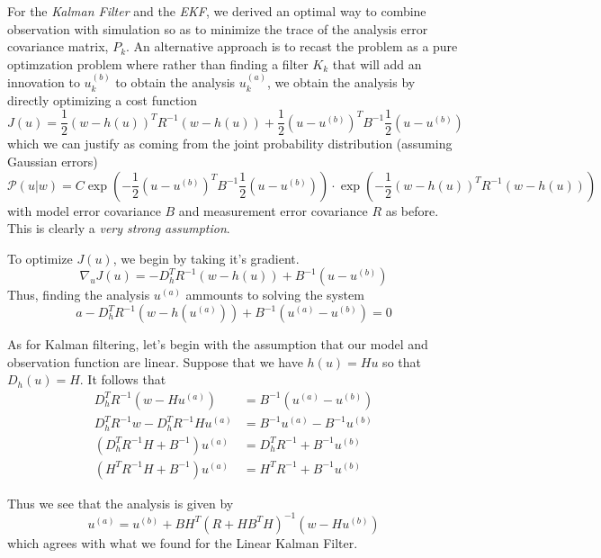 For the \textit{Kalman Filter} and the \textit{EKF}, we derived an optimal way to combine observation with simulation so as to minimize the trace of the analysis error covariance matrix, $P_k$. An alternative approach is to recast the problem as a pure optimzation problem where rather than finding a filter $K_k$ that will add an innovation to $u_k^{(b)}$ to obtain the analysis $u_k^{(a)}$, we obtain the analysis by directly optimizing a cost function
\begin{equation}
J(u) = \frac{1}{2}\left(w - h(u) \right)^TR^{-1}\left(w - h(u) \right) + \frac{1}{2}\left(u - u^{(b)} \right)^TB^{-1}\frac{1}{2}\left(u - u^{(b)} \right)
\end{equation}
which we can justify as coming from the joint probability distribution (assuming Gaussian errors)
\begin{equation}
\mathcal{P}(u|w) = C\exp\left(- \frac{1}{2}\left(u - u^{(b)} \right)^TB^{-1}\frac{1}{2}\left(u - u^{(b)} \right) \right)\cdot\exp\left(-  \frac{1}{2}\left(w - h(u) \right)^TR^{-1}\left(w - h(u) \right) \right)
\end{equation}
with model error covariance $B$ and measurement error covariance $R$ as before. This is clearly a \textit{very strong assumption}.

To optimize $J(u)$, we begin by taking it's gradient.
\begin{equation}
    \nabla_uJ(u) = -D_h^TR^{-1}(w-h(u)) + B^{-1}(u-u^{(b)})
\end{equation}
Thus, finding the analysis $u^{(a)}$ ammounts to solving the system
\begin{equation}
    a-D_h^TR^{-1}(w-h(u^{(a)})) + B^{-1}(u^{(a)}-u^{(b)}) = 0
\end{equation}

As for Kalman filtering, let's begin with the assumption that our model and observation function are linear. Suppose that we have $h(u) = Hu$ so that $D_h(u) = H$. It follows that
\begin{align}
  D_h^TR^{-1}(w-Hu^{(a)}) &= B^{-1}(u^{(a)}-u^{(b)}) \\
  D_h^TR^{-1}w - D_h^TR^{-1}Hu^{(a)} &= B^{-1}u^{(a)} - B^{-1}u^{(b)} \\
  \left(D_h^TR^{-1}H + B^{-1} \right)u^{(a)} &= D_h^TR^{-1} + B^{-1}u^{(b)} \\
  \left(H^TR^{-1}H + B^{-1} \right)u^{(a)} &= H^TR^{-1} + B^{-1}u^{(b)}
\end{align}

Thus we see that the analysis is given by
\begin{equation}
  u^{(a)} = u^{(b)} + BH^T\left( R + HB^TH \right)^{-1}(w-Hu^{(b)})
\end{equation}
which agrees with what we found for the Linear Kalman Filter.


